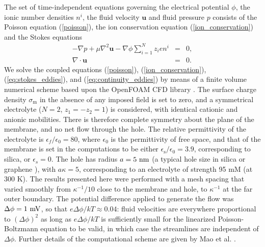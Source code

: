 The set of
time-independent equations governing the electrical potential
$\phi$, the ionic number densities $n^i$,
the fluid velocity $\mathbf{u}$ and fluid pressure $p$
consists of the Poisson equation (\ref{poisson}), the ion
conservation equation (\ref{ion_conservation}) and the Stokes equations
\begin{eqnarray}
-\nabla p + \mu \nabla^2 \mathbf{u} -  \nabla \phi \sum_{i=1}^{N} z_ien^i & = & 0, \label{eq:stokes_eddies}\\
\nabla \cdot \mathbf{u} & = & 0. \label{eq:continuity_eddies}
\end{eqnarray}
We solve the coupled equations (\ref{poisson}), (\ref{ion_conservation}),
(\ref{eq:stokes_eddies}),  and (\ref{eq:continuity_eddies})
by means of a finite volume numerical scheme based upon the
OpenFOAM CFD library \cite{OPENFOAM}.
The surface charge density $\sigma_\text{m}$ in the absence
of any imposed field
is set to zero, and a symmetrical electrolyte
($N=2$, $z_1=-z_2=1$)  is considered, with
identical cationic and anionic mobilities.
There is therefore complete symmetry about the plane of the
membrane, and no net flow through the hole. The relative permittivity
of the electrolyte
is $\epsilon_f/\epsilon_0=80$, where $\epsilon_0$ is the permittivity of
free space, and that of the membrane is set in the computations to be either
$\epsilon_\text{s}/\epsilon_0=3.9$,
corresponding to silica, or $\epsilon_s=0$.
The hole has radius $a=5\rm\ nm$ (a typical
hole size in silica \cite{Keyser2006} or graphene \cite{Garaj2010,Merchant2010}), with
$a\kappa=5$, corresponding to an electrolyte
of strength 95 mM (at 300 K).
The results presented here were performed with a mesh spacing
that varied smoothly from $\kappa^{-1}/10$
close to the membrane and hole, to $\kappa^{-1}$ at the far outer boundary.
The potential difference applied to generate the flow was $\Delta\phi=1\rm\ mV$,
so that $e\Delta\phi/kT\approx 0.04$: fluid velocities are
everywhere proportional
to $(\Delta\phi)^2$ as long as $e\Delta\phi/kT$ is sufficiently small
for the linearized Poisson-Boltzmann equation to be valid, in which case
the streamlines are independent of $\Delta\phi$.
Further details of the computational scheme are given by
Mao et al. \cite{mao2014}.

